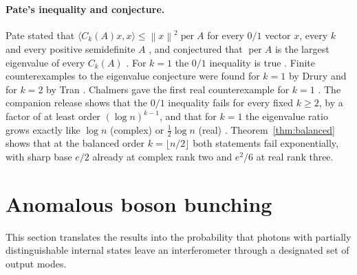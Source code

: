 \documentclass[11pt,a4paper]{article}
\theoremstyle{remark}
\newcommand{\per}{\operatorname{per}}
\newcommand{\norm}[1]{\left\lVert#1\right\rVert}
\begin{document}
\paragraph{Pate's inequality and conjecture.}
Pate stated that $\langle C_k(A)x,x\rangle\le\norm x^2\per A$ for every $0/1$ vector $x$, every $k$ and every positive semidefinite $A$ \cite[Theorem~7]{Pate}, and conjectured that $\per A$ is the largest eigenvalue of every $C_k(A)$ \cite[Conjecture~2]{Pate}. For $k=1$ the $0/1$ inequality is true \cite[Corollary~3]{Pate}. Finite counterexamples to the eigenvalue conjecture were found for $k=1$ by Drury \cite{Drury18} and for $k=2$ by Tran \cite{Anh}. Chalmers gave the first real counterexample for $k=1$ \cite{Chalmers}. The companion release shows that the $0/1$ inequality fails for every fixed $k\ge2$, by a factor of at least order $(\log n)^{k-1}$, and that for $k=1$ the eigenvalue ratio grows exactly like $\log n$ (complex) or $\tfrac12\log n$ (real) \cite{EPBS}. Theorem~\ref{thm:balanced} shows that at the balanced order $k=\lfloor n/2\rfloor$ both statements fail exponentially, with sharp base $e/2$ already at complex rank two and $e^2/6$ at real rank three.

\section{Anomalous boson bunching}\label{sec:optics}
This section translates the results into the probability that photons with partially distinguishable internal states leave an interferometer through a designated set of output modes.
\end{document}

